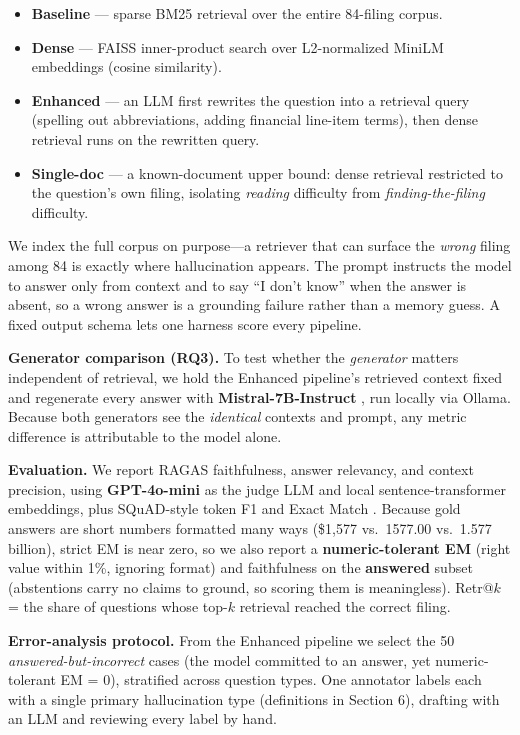 \documentclass[11pt]{article}
\providecommand{\tightlist}{\setlength{\itemsep}{0pt}\setlength{\parskip}{0pt}}
\begin{document}
\begin{itemize}
\tightlist
\item
  \textbf{Baseline} --- sparse BM25 retrieval over the entire 84-filing
  corpus.
\item
  \textbf{Dense} --- FAISS inner-product search over L2-normalized
  MiniLM embeddings (cosine similarity).
\item
  \textbf{Enhanced} --- an LLM first rewrites the question into a
  retrieval query (spelling out abbreviations, adding financial
  line-item terms), then dense retrieval runs on the rewritten query.
\item
  \textbf{Single-doc} --- a known-document upper bound: dense retrieval
  restricted to the question's own filing, isolating \emph{reading}
  difficulty from \emph{finding-the-filing} difficulty.
\end{itemize}

We index the full corpus on purpose---a retriever that can surface the
\emph{wrong} filing among 84 is exactly where hallucination appears. The
prompt instructs the model to answer only from context and to say ``I
don't know'' when the answer is absent, so a wrong answer is a grounding
failure rather than a memory guess. A fixed output schema lets one
harness score every pipeline.

\textbf{Generator comparison (RQ3).} To test whether the
\emph{generator} matters independent of retrieval, we hold the Enhanced
pipeline's retrieved context fixed and regenerate every answer with
\textbf{Mistral-7B-Instruct} \citep{jiang2023mistral}, run locally via
Ollama. Because both generators see the \emph{identical} contexts and
prompt, any metric difference is attributable to the model alone.

\textbf{Evaluation.} We report RAGAS \citep{es2024ragas} faithfulness,
answer relevancy, and context precision, using \textbf{GPT-4o-mini} as
the judge LLM and local sentence-transformer embeddings, plus
SQuAD-style token F1 and Exact Match \citep{rajpurkar2016squad}. Because
gold answers are short numbers formatted many ways (\$1,577 vs.~1577.00
vs.~1.577 billion), strict EM is near zero, so we also report a
\textbf{numeric-tolerant EM} (right value within 1\%, ignoring format)
and faithfulness on the \textbf{answered} subset (abstentions carry no
claims to ground, so scoring them is meaningless). Retr@\(k\) = the
share of questions whose top-\(k\) retrieval reached the correct filing.

\textbf{Error-analysis protocol.} From the Enhanced pipeline we select
the 50 \emph{answered-but-incorrect} cases (the model committed to an
answer, yet numeric-tolerant EM = 0), stratified across question types.
One annotator labels each with a single primary hallucination type
(definitions in Section 6), drafting with an LLM and reviewing every
label by hand.
\end{document}
